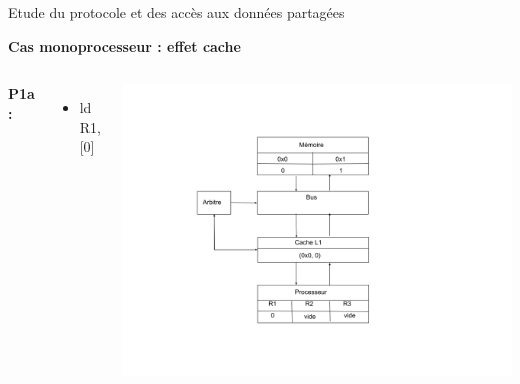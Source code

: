 \documentclass{beamer}
\begin{document}
\begin{frame}{Etude du protocole et des accès aux données partagées}
    \addtocounter{framenumber}{-1}
    \textbf{Cas monoprocesseur : effet cache}
    \begin{columns}[c] %

        \textbf{P1a : }
        \begin{itemize}
            \item ld R1, [0]
        \end{itemize}

        \includegraphics[scale=0.28]{f1.png}
        
    \end{columns}
\end{frame}
\end{document}
